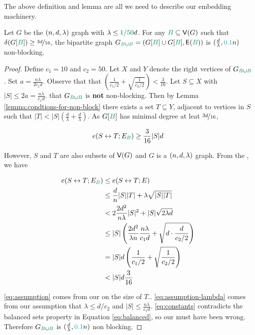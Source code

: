 \documentclass[11pt]{article}
\begin{document}
The above definition and lemma are all we need to describe our embedding machinery.

\begin{lemma}\label{lemma:bipartitie-is-non-blocking}Let $G$ be the $(n, d, \lambda)$ graph with $\lambda \leq \epsilonL d$. For any $\GreenB \subseteq \Vertices{G}$ such that $\MinimalDegree{G[\GreenB]} \geq \nicefrac{3d}{16}$,
 the bipartite graph  $\BipartiteG = (G[\GreenB] \cup G[\GreenB], \Edges{\GreenB})$ is $(\frac{d}{\lambda}, \epsilonA n)$ non-blocking.
\end{lemma}

\begin{proof}
  Define $c_1 = 10$ and $c_2 = 50$. Let $X$ and $Y$ denote the right vertices of $\BipartiteG$.
  Set $a = \frac{n\lambda}{2c_1 d}$.
  Observe that that $\left(\frac{1}{c_1/2}  + \sqrt{\frac{1}{c_2/2}}\right) < \frac{3}{16}$.
Let $S \subseteq X$ with $|S| \leq 2a = \frac{n\lambda}{c_1 d}$.
 that $\BipartiteG$ is \textbf{not} non-blocking.
  Then by Lemma \ref{lemma:condtions-for-non-block} there exists a set $T \subseteq Y$, adjacent to vertices in $S$ such that $|T| < |S|(\frac{d}{\lambda}+\frac{d}{\lambda})$. 
As $G[\GreenB]$ has minimal degree at leat $\nicefrac{3d}{16}$, 

\begin{equation}\label{eq:balanced}
  \CutEdges{S}{T}{E_{\GreenB}} \geq \frac{3}{16}|S|d
\end{equation}

However, $S$ and $T$ are also subsets of $\mathsf{V}(G)$ and $G$ is a $(n, d, \lambda)$ graph.
From the , we have

\begin{align}
  \CutEdges{S}{T}{E_{\GreenB}} &\leq   \CutEdges{S}{T}{E} \\
  &\leq \frac{d}{n}|S||T| + \lambda\sqrt{|S||T|} \\
	&< 2\frac{2d^2}{n\lambda}|S|^2 + |S|\sqrt{2\lambda d} \label{eq:assumption}\\
	&\leq |S|\left(\frac{2d^2}{\lambda n} \frac{n\lambda}{c_1 d} + \sqrt{d\cdot \frac{d}{c_2/2}}\right) \label{eq:assumption-lambda}\\
	&= |S|d\left(\frac{1}{c_1/2}  + \sqrt{\frac{1}{c_2/2}}\right) \\
	&< |S|d\frac{3}{16} \label{eq:constants}
\end{align}

\eqref{eq:assumption} comes from our  on the size of $T$..
\eqref{eq:assumption-lambda} comes from our assumption that $\lambda \leq  d/c_2$ and $|S| \leq \frac{n\lambda}{c_1 d}$.
\eqref{eq:constants} contradicts the balanced sets property in Equation \eqref{eq:balanced}, so our  must have been wrong.
Therefore $\BipartiteG$ is $(\frac{d}{\lambda}, \epsilonA n)$ non blocking.
\end{proof}
\end{document}

